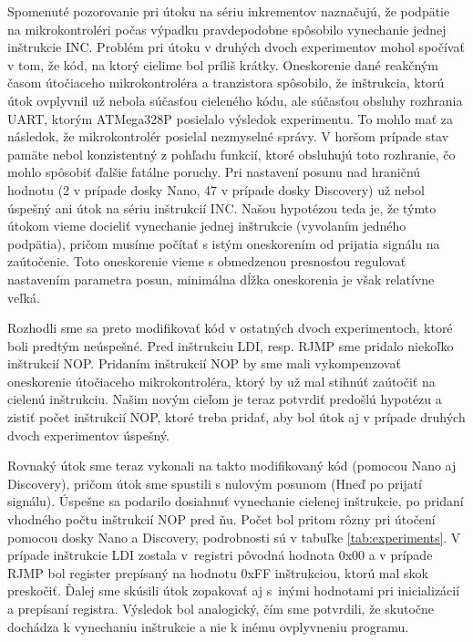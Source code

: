 Spomenuté pozorovanie pri útoku na sériu inkrementov naznačujú, že podpätie na mikrokontroléri počas výpadku pravdepodobne spôsobilo vynechanie jednej inštrukcie INC. Problém pri útoku v druhých dvoch experimentov mohol spočívať v tom, že kód, na ktorý cielime bol príliš krátky. Oneskorenie dané reakčným časom útočiaceho mikrokontroléra a tranzistora spôsobilo, že inštrukcia, ktorú útok ovplyvnil už nebola súčasťou cieleného kódu, ale súčasťou obsluhy rozhrania UART, ktorým ATMega328P posielalo výsledok experimentu. To mohlo mať za následok, že mikrokontrolér posielal nezmyselné správy. V horšom prípade stav pamäte nebol konzistentný z pohľadu funkcií, ktoré obsluhujú toto rozhranie, čo mohlo spôsobiť ďalšie fatálne poruchy. Pri nastavení posunu nad hraničnú hodnotu (2 v prípade dosky Nano, 47 v prípade dosky Discovery) už nebol úspešný ani útok na sériu inštrukcií INC. Našou hypotézou teda je, že týmto útokom vieme docieliť vynechanie jednej inštrukcie (vyvolaním jedného podpätia), pričom musíme počítať s istým oneskorením od prijatia signálu na zaútočenie. Toto oneskorenie vieme s obmedzenou presnosťou regulovať nastavením parametra posun, minimálna dĺžka oneskorenia je však relatívne veľká.

Rozhodli sme sa preto modifikovať kód v ostatných dvoch experimentoch, ktoré boli predtým neúspešné. Pred inštrukciu LDI, resp. RJMP sme pridalo niekoľko inštrukcií NOP. Pridaním inštrukcií NOP by sme mali vykompenzovať oneskorenie útočiaceho mikrokontroléra, ktorý by už mal stihnúť zaútočiť na cielenú inštrukciu. Našim novým cieľom je teraz potvrdiť predošlú hypotézu a zistiť počet inštrukcií NOP, ktoré treba pridať, aby bol útok aj v prípade druhých dvoch experimentov úspešný.

Rovnaký útok sme teraz vykonali na takto modifikovaný kód (pomocou Nano aj Discovery), pričom útok sme spustili s nulovým posunom (Hneď po prijatí signálu). Úspešne sa podarilo dosiahnuť vynechanie cielenej inštrukcie, po pridaní vhodného počtu inštrukcií NOP pred ňu. Počet bol pritom rôzny pri útočení pomocou dosky Nano a Discovery, podrobnosti sú v tabuľke \ref{tab:experiments}. V prípade inštrukcie LDI zostala v~registri pôvodná hodnota 0x00 a v prípade RJMP bol register prepísaný na hodnotu 0xFF inštrukciou, ktorú mal skok preskočiť. Ďalej sme skúsili útok zopakovať aj s~inými hodnotami pri inicializácií a prepísaní registra. Výsledok bol analogický, čím sme potvrdili, že skutočne dochádza k vynechaniu inštrukcie a nie k inému ovplyvneniu programu.

